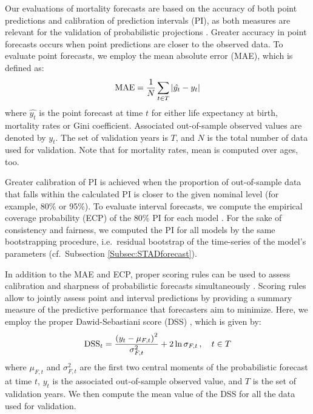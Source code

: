 \documentclass[11pt, a4paper]{article}
\begin{document}
Our evaluations of mortality forecasts are based on the accuracy of both point predictions and calibration of prediction intervals (PI), as both measures are relevant for the validation of probabilistic projections \citep{chatfield2000time}. Greater accuracy in point forecasts occurs when point predictions are closer to the observed data. To evaluate point forecasts, we employ the mean absolute error (MAE), which is defined as:
%
\begin{equation}\label{Eq:MAE}
	\mathrm{MAE} = \frac{1}{N} \sum_{t \in T} \left| \hat{y_t} - y_t \right|  \notag 
\end{equation}
% 
where $\hat{y_t}$ is the point forecast at time $t$ for either life expectancy at birth, mortality rates or Gini coefficient. Associated out-of-sample observed values are denoted by $y_t$. The set of validation years is $T$, and $N$ is the total number of data used for validation. Note that for mortality rates, mean is computed over ages, too. 

Greater calibration of PI is achieved when the proportion of out-of-sample data that falls within the calculated PI is closer to the given nominal level (for example, 80\% or 95\%). To evaluate interval forecasts, we compute the empirical coverage probability (ECP) of the 80\% PI for each model \cite[as in, for example,][]{shang2011point,raftery2013bayesian}. For the sake of consistency and fairness, we computed the PI for all models by the same bootstrapping procedure, i.e.~residual bootstrap of the time-series of the model's parameters (cf.~Subsection \ref{Subsec:STADforecast}).

{\color{red}In addition to the MAE and ECP, proper scoring rules can be used to assess calibration and sharpness of probabilistic forecasts simultaneously \cite[for a review, see][]{gneiting2014probabilistic}. Scoring rules allow to jointly assess point and interval predictions by providing a summary measure of the predictive performance that forecasters aim to minimize. Here, we employ the proper Dawid-Sebastiani score (DSS) \citep{dawid1999coherent}, which is given by:
%
\begin{equation}\label{Eq:DSS}
\mathrm{DSS}_t = \frac{\left(y_t-\mu_{F,t}\right)^2}{\sigma^2_{F,t}} + 2 \ln \sigma_{F,t}  \,, \quad t \in T \notag 
\end{equation}
%
where $\mu_{F,t}$ and $\sigma^2_{F,t}$ are the first two central moments of the probabilistic forecast at time $t$, $y_t$ is the associated out-of-sample observed value, and $T$ is the set of validation years. We then compute the mean value of the DSS for all the data used for validation. 
}
\end{document}
